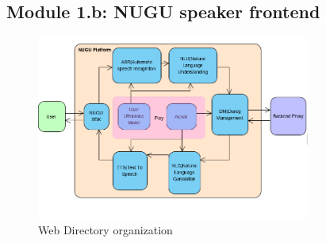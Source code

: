 \documentclass[conference]{IEEEtran}
\begin{document}
\subsection{Module 1.b: NUGU speaker frontend}
\begin{figure}[htbp]
\centerline{\includegraphics[width=90mm,scale=0.5]{fig/6_7.png}}
\caption{Web Directory organization}
\label{fig}
\end{figure}
\end{document}
